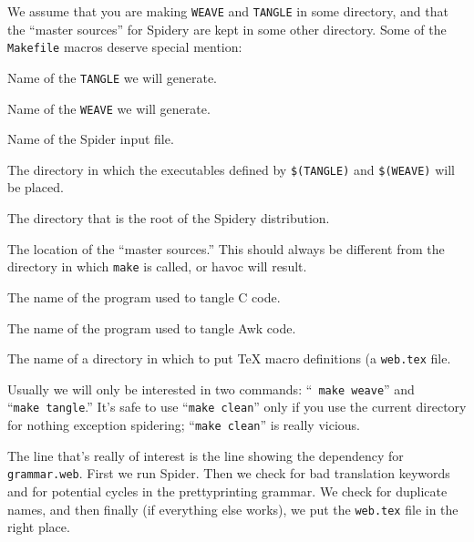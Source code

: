 We assume that you are making {\tt WEAVE} and {\tt TANGLE} in some
directory, and that the ``master sources'' for Spidery {\WEB} are kept
in some other directory.
Some of the  {\tt Makefile} macros deserve special mention:
\begin{description}
\renewcommand{\makelabel}[1]{{\tt#1}\hfil}
\item[THETANGLE]
Name of the {\tt TANGLE} we will generate.
\item[THEWEAVE]
Name of the {\tt WEAVE} we will generate.
\item[SPIDER]
Name of the {Spider} input file.
\item[DEST]
The directory in which the executables defined by \verb+$(TANGLE)+ and
\verb+$(WEAVE)+ will be placed.
\item[WEBROOT]
The directory that is the root of the Spidery {\WEB} distribution.
\item[MASTER]
The location of the ``master sources.''
This should always be different from the directory in which {\tt make}
is called, or havoc will result.
\item[CTANGLE]
The name of the program used to tangle C code.
\item[AWKTANGLE]
The name of the program used to tangle Awk code.
\item[MACROS]
The name of a directory in which to put {\TeX} macro definitions (a
{\tt *web.tex} file.
\end{description}

Usually we will only be interested in two commands: ``\/{\tt
make~weave}'' and ``\/{\tt make~tangle}.''
It's safe to use ``\/{\tt make~clean}'' only if you use the current
directory for nothing exception spidering; ``\/{\tt make~clean}'' is
really vicious.

The line that's really of interest is the line showing the dependency
for {\tt grammar.web}.
First we run {Spider}.
Then we check for bad translation keywords and for potential cycles in
the prettyprinting grammar.
We check for duplicate names, and then finally (if everything else
works), we put the {\tt *web.tex} file in the right place.

